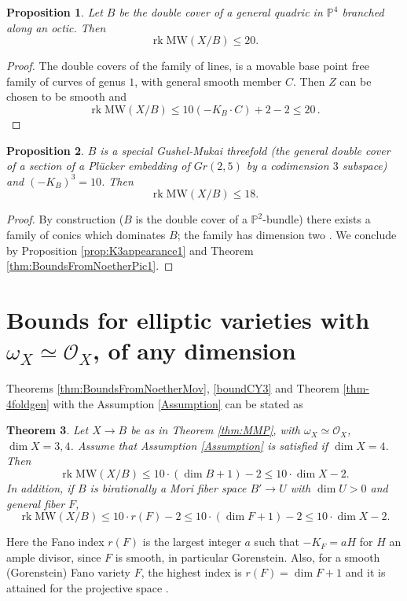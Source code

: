 \documentclass[11pt]{amsart}
\newtheorem{theorem}{Theorem}[section]
\newtheorem{proposition}[theorem]{Proposition}
\theoremstyle{definition}
\theoremstyle{definition}
\theoremstyle{remark}
\theoremstyle{remark}
\theoremstyle{definition}
\theoremstyle{conjecture}
\newcommand{\MW}{\mathrm{MW}}
\begin{document}
\begin{proposition}
 Let $B$ be the double cover of a \textit{ general} quadric in $\mathbb{P}^4$ branched along an octic. Then  
\[\operatorname{rk} \MW(X/B)  \leq 20 .\]
\end{proposition}
\begin{proof} The double covers of the family of lines, is a movable base point free family of curves of genus $1$, with general smooth member $C$.    Then $Z$ can be chosen to be smooth  and 
$$\operatorname{rk} \MW(X/B)  \leq  10(-K_B \cdot C ) +2-2 \leq 20 \,.$$ \end{proof}

 \begin{proposition}
    $B$ is   a special Gushel-Mukai threefold (the general double cover of a section of  a Plücker embedding of $Gr(2,5)$ by a codimension $3$ subspace) and $(-K_B)^3=10$. Then
    \[
	\operatorname{rk} \MW(X/B)  \leq  18.
	\]
\end{proposition}
   
\begin{proof}  By construction ($B$ is the double cover of a $\mathbb{P}^2$-bundle) there exists a  family of conics which dominates $B$; the family has dimension two  \cite[Theorem 7.3, Remark 7.4]{debarre2024quadricsgushelmukaivarieties}. We conclude by  Proposition \ref{prop:K3appearance1} and Theorem \ref{thm:BoundsFromNoetherPic1}.\end{proof}




\section{Bounds for elliptic varieties with $\omega_X \simeq \mathcal{O}_X$, 
of any dimension}\label{conjecture}
 Theorems \ref{thm:BoundsFromNoetherMov}, \ref{boundCY3} and Theorem \ref{thm-4foldgen}  with the Assumption \ref{Assumption} can be stated as
 \begin{theorem}\label{thm:boundsCY3and4Combined} Let  $ X \to B$ be as in Theorem \ref{thm:MMP}, with $\omega_X \simeq \mathcal{O}_X$, 
 $\dim X=3,4$.   Assume that Assumption \ref{Assumption} is satisfied if $\dim X=4$. Then
  \[\operatorname{rk} \MW(X/B) \leq  10 \cdot (\dim B +1) -2 \leq 10 \cdot  \dim X -2.\] 
In addition, if $B$ is birationally    a  Mori fiber space  $B' \to U$ with $\dim U >0$  and 
general      fiber  $F$, 
\[\operatorname{rk} \MW(X/B) \leq 10 \cdot  r(F)-2  \leq 10 \cdot (\dim F +1) -2 \leq 10 \cdot  \dim X -2.\]
 \end{theorem}
Here the Fano index $r(F)$ is the largest integer $a$ such that $-K_F = a H$ for $H$ an ample divisor, since $F$ is smooth, in particular Gorenstein. 
Also, for a smooth (Gorenstein) Fano variety $F$, the highest index is $r(F)=\dim F+1$ and it is attained for the projective space \cite{KobayashiOchiai1973}. \\
\end{document}
